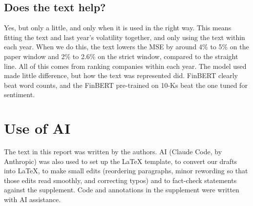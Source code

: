 \documentclass[11pt,a4paper]{article}
\begin{document}
\subsection{Does the text help?}

Yes, but only a little, and only when it is used in the right way. This means fitting the text and last year's volatility together, and only using the text within each year. When we do this, the text lowers the MSE by around 4\% to 5\% on the paper window and 2\% to 2.6\% on the strict window, compared to the straight line. All of this comes from ranking companies within each year. The model used made little difference, but how the text was represented did. FinBERT clearly beat word counts, and the FinBERT pre-trained on 10-Ks beat the one tuned for sentiment.
\section*{Use of AI}
The text in this report was written by the authors. AI (Claude Code, by Anthropic) was also used to set up the \LaTeX{} template, to convert our drafts into \LaTeX{}, to make small edits (reordering paragraphs, minor rewording so that those edits read smoothly, and correcting typos) and to fact-check statements against the supplement. Code and annotations in the supplement were written with AI assistance.



\end{document}
